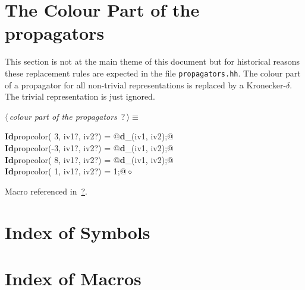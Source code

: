 \documentclass[a4paper,12pt]{amsart}
\renewcommand{\NWtarget}[2]{\hypertarget{#1}{#2}}
\renewcommand{\NWlink}[2]{\hyperlink{#1}{#2}}
\renewcommand{\NWtxtMacroRefIn}{Macro referenced in}
\renewcommand{\NWsep}{${\diamond}$}
\begin{document}
\section{The Colour Part of the propagators}
This section is not at the main theme of this document but for
historical reasons these replacement rules are expected in the
file \texttt{propagators.hh}. The colour part of a propagator
for all non-trivial representations is replaced by a Kronecker-$\delta$.
The trivial representation is just ignored.
\begin{flushleft} \small
\begin{minipage}{\linewidth}\label{scrap43}\raggedright\small
\NWtarget{nuweb?}{} $\langle\,${\it colour part of the propagators}\nobreak\ {\footnotesize {?}}$\,\rangle\equiv$
\vspace{-1ex}
\begin{list}{}{} \item
\mbox{}\verb@@\hbox{\sffamily\bfseries Id}\verb@ propcolor( 3, iv1?, iv2?) = @\hbox{\sffamily\bfseries d}\verb@_(iv1, iv2);@\\
\mbox{}\verb@@\hbox{\sffamily\bfseries Id}\verb@ propcolor(-3, iv1?, iv2?) = @\hbox{\sffamily\bfseries d}\verb@_(iv1, iv2);@\\
\mbox{}\verb@@\hbox{\sffamily\bfseries Id}\verb@ propcolor( 8, iv1?, iv2?) = @\hbox{\sffamily\bfseries d}\verb@_(iv1, iv2);@\\
\mbox{}\verb@@\hbox{\sffamily\bfseries Id}\verb@ propcolor( 1, iv1?, iv2?) = 1;@{\NWsep}
\end{list}
\vspace{-1.5ex}
\footnotesize
\begin{list}{}{\setlength{\itemsep}{-\parsep}\setlength{\itemindent}{-\leftmargin}}
\item \NWtxtMacroRefIn\ \NWlink{nuweb?}{?}.

\item{}
\end{list}
\end{minipage}\vspace{4ex}
\end{flushleft}

\appendix

\section{Index of Symbols}


\section{Index of Macros}
\end{document}
